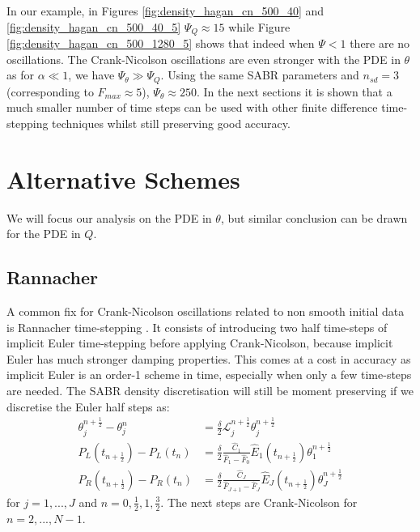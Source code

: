 \documentclass[]{rAMF2e}
\begin{document}
In our example, in Figures \ref{fig:density_hagan_cn_500_40} and \ref{fig:density_hagan_cn_500_40_5} $\Psi_Q \approx 15$ while Figure \ref{fig:density_hagan_cn_500_1280_5} shows that indeed when $\Psi < 1$ there are no oscillations. The Crank-Nicolson oscillations are even stronger with the PDE in $\theta$ as for $\alpha \ll 1$, we have $\Psi_{\theta} \gg \Psi_Q$. Using the same SABR parameters and $n_{sd}=3$ (corresponding to $F_{max} \approx 5$), $\Psi_{\theta} \approx 250$. In the next sections it is shown that a much smaller number of time steps can be used with other finite difference time-stepping techniques whilst still preserving good accuracy.

\section{Alternative Schemes}
We will focus our analysis on the PDE in $\theta$, but similar conclusion can be drawn for the PDE in $Q$.

\subsection{Rannacher}
A common fix for Crank-Nicolson oscillations related to non smooth initial data is Rannacher time-stepping \citep{rannacher1984finite, pooley2003convergence, GiCa2006}. It consists of introducing two half time-steps of implicit Euler time-stepping before applying Crank-Nicolson, because implicit Euler has much stronger damping properties. This comes at a cost in accuracy as implicit Euler is an order-1 scheme in time, especially when only a few time-steps are needed.
The SABR density discretisation will still be moment preserving if we discretise the Euler half steps as:
\begin{subequations}\label{eqn_euler_1}
\begin{align}
\theta_j^{n+\frac{1}{2}}-\theta_j^n &= \frac{\delta}{2} \mathcal{L}_{j}^{n+\frac{1}{2}} \theta_j^{n+\frac{1}{2}} \\
P_L (t_{n+\frac{1}{2}}) - P_L (t_{n}) &=   \frac{\delta}{2} \frac{\hat{C}_1}{\hat{F}_1-\hat{F}_0}\hat{E}_1(t_{n+\frac{1}{2}})\theta_1^{n+\frac{1}{2}} \\
P_R (t_{n+\frac{1}{2}}) -  P_R (t_{n}) &=\frac{\delta}{2} \frac{\hat{C}_J}{\hat{F}_{J+1}-\hat{F}_J}\hat{E}_J(t_{n+\frac{1}{2}})\theta_J^{n+\frac{1}{2}}
\end{align}
\end{subequations}
for $j=1,...,J$ and $n = 0, \frac{1}{2}, 1, \frac{3}{2}$. The next steps are Crank-Nicolson for $n=2,...,N-1$.
\end{document}
